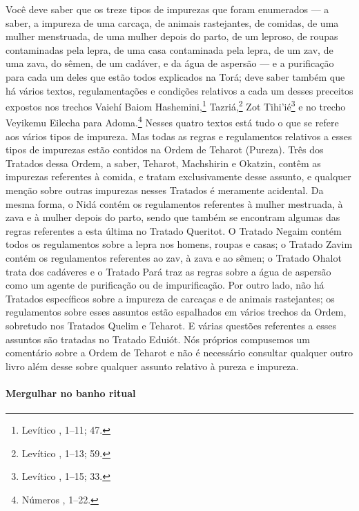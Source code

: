 \begin{multicols}{2}
Você deve saber que os treze tipos de impurezas que foram enumerados
--- a saber, a impureza de uma carcaça, de animais rastejantes, de
comidas, de uma mulher menstruada, de uma mulher depois do parto, de um
leproso, de roupas contaminadas pela lepra, de uma casa contaminada
pela lepra, de um zav\starr, de uma zava\starr, do sêmen, de um cadáver, e
da água de aspersão --- e a purificação para cada um deles que estão
todos explicados na Torá\starr; deve saber também que há vários textos, regulamentações e condições relativos a cada um desses preceitos expostos nos trechos Vaiehí Baiom Hashemini\starr,\footnote{Levítico , 1--11; 47.} Tazriá\starr,\footnote{Levítico , 1--13; 59.} Zot Tihi'ié\starr\footnote{Levítico , 1--15; 33.} e no trecho Veyikemu Eilecha para
Adoma.\footnote{Números , 1--22.}
Nesses quatro textos está tudo o que se refere aos vários tipos de
impureza. Mas todas as regras e regulamentos relativos a esses tipos de
impurezas estão contidos na Ordem de Teharot\starr{} (Pureza). Três dos
Tratados dessa Ordem, a saber, Teharot\starr, Machshirin\starr{} e Okatzin\starr, contêm as
impurezas referentes à comida, e tratam exclusivamente desse assunto, e
qualquer menção sobre outras impurezas nesses Tratados é meramente
acidental. Da mesma forma, o Nidá\starr{} contém os regulamentos referentes à
mulher mestruada, à zava\starr{} e à mulher depois do parto, sendo que
também se encontram algumas das regras referentes a esta última no
Tratado Queritot\starr. O Tratado Negaim\starr{} contém todos os regulamentos sobre a
lepra nos homens, roupas e casas; o Tratado Zavim\starr{} contém os
regulamentos referentes ao zav\starr, à zava\starr{} e ao sêmen; o Tratado
Ohalot\starr{} trata dos cadáveres e o Tratado Pará\starr{} traz as regras sobre a água
de aspersão como um agente de purificação ou de impurificação. Por outro
lado, não há Tratados específicos sobre a impureza de carcaças e de
animais rastejantes; os regulamentos sobre esses assuntos estão
espalhados em vários trechos da Ordem, sobretudo nos Tratados Quelim\starr{} e
Teharot\starr. E várias questões referentes a esses assuntos são tratadas no
Tratado Eduiót\starr. Nós próprios compusemos um comentário sobre a Ordem de
Teharot\starr{} e não é necessário consultar qualquer outro livro além desse
sobre qualquer assunto relativo à pureza e impureza.

\paragraph{Mergulhar no banho ritual}


\end{multicols}
